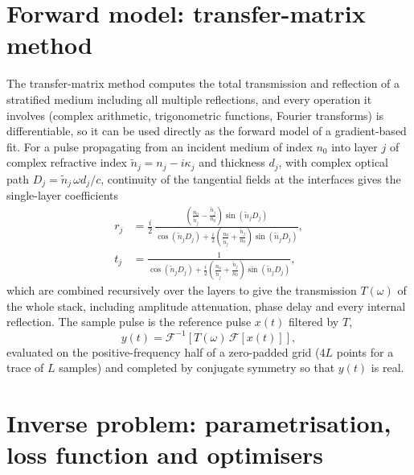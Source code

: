 \documentclass{optica-article}
\newcommand{\kap}{\kappa}
\begin{document}
\section{Forward model: transfer-matrix method}\label{sec:tmm}
The transfer-matrix method computes the total transmission and reflection of a stratified medium including all multiple reflections, and every operation it involves (complex arithmetic, trigonometric functions, Fourier transforms) is differentiable, so it can be used directly as the forward model of a gradient-based fit. For a pulse propagating from an incident medium of index $n_0$ into layer $j$ of complex refractive index $\tilde n_j = n_j - i\kap_j$ and thickness $d_j$, with complex optical path $D_j=\tilde n_j\,\omega d_j/c$, continuity of the tangential fields at the interfaces gives the single-layer coefficients \cite{BornWolf1999,Yeh1988}
\begin{align}
  r_j &= \frac{i}{2}\,\frac{\left(\frac{n_0}{\tilde n_j}-\frac{\tilde n_j}{n_0}\right)\sin(\tilde n_j D_j)}{\cos(\tilde n_j D_j)+\frac{i}{2}\left(\frac{n_0}{\tilde n_j}+\frac{\tilde n_j}{n_0}\right)\sin(\tilde n_j D_j)}, \label{eq:r}\\
  t_j &= \frac{1}{\cos(\tilde n_j D_j)+\frac{i}{2}\left(\frac{n_0}{\tilde n_j}+\frac{\tilde n_j}{n_0}\right)\sin(\tilde n_j D_j)}, \label{eq:t}
\end{align}
which are combined recursively over the layers to give the transmission $T(\omega)$ of the whole stack, including amplitude attenuation, phase delay and every internal reflection. The sample pulse is the reference pulse $x(t)$ filtered by $T$,
\begin{equation}
  y(t)=\mathcal{F}^{-1}\!\left[T(\omega)\,\mathcal{F}[x(t)]\right],
  \label{eq:forward}
\end{equation}
evaluated on the positive-frequency half of a zero-padded grid ($4L$ points for a trace of $L$ samples) and completed by conjugate symmetry so that $y(t)$ is real.

\section{Inverse problem: parametrisation, loss function and optimisers}\label{sec:inverse}
\end{document}
